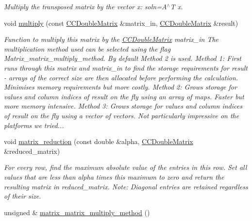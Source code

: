 \begin{DoxyCompactItemize}
\begin{DoxyCompactList}\small\item\em Multiply the transposed matrix by the vector x\+: soln=A$^\wedge$T x. \end{DoxyCompactList}\item 
void \hyperlink{classoomph_1_1CCDoubleMatrix_ae6834fcfc28dca27243ec53ea48d34be}{multiply} (const \hyperlink{classoomph_1_1CCDoubleMatrix}{C\+C\+Double\+Matrix} \&matrix\+\_\+in, \hyperlink{classoomph_1_1CCDoubleMatrix}{C\+C\+Double\+Matrix} \&result)
\begin{DoxyCompactList}\small\item\em Function to multiply this matrix by the \hyperlink{classoomph_1_1CCDoubleMatrix}{C\+C\+Double\+Matrix} matrix\+\_\+in The multiplication method used can be selected using the flag Matrix\+\_\+matrix\+\_\+multiply\+\_\+method. By default Method 2 is used. Method 1\+: First runs through this matrix and matrix\+\_\+in to find the storage requirements for result -\/ arrays of the correct size are then allocated before performing the calculation. Minimises memory requirements but more costly. Method 2\+: Grows storage for values and column indices of result \textquotesingle{}on the fly\textquotesingle{} using an array of maps. Faster but more memory intensive. Method 3\+: Grows storage for values and column indices of result \textquotesingle{}on the fly\textquotesingle{} using a vector of vectors. Not particularly impressive on the platforms we tried... \end{DoxyCompactList}\item 
void \hyperlink{classoomph_1_1CCDoubleMatrix_a600a58c92baf401a534598cedcfd3415}{matrix\+\_\+reduction} (const double \&alpha, \hyperlink{classoomph_1_1CCDoubleMatrix}{C\+C\+Double\+Matrix} \&reduced\+\_\+matrix)
\begin{DoxyCompactList}\small\item\em For every row, find the maximum absolute value of the entries in this row. Set all values that are less than alpha times this maximum to zero and return the resulting matrix in reduced\+\_\+matrix. Note\+: Diagonal entries are retained regardless of their size. \end{DoxyCompactList}\item 
unsigned \& \hyperlink{classoomph_1_1CCDoubleMatrix_ac30e2e7873bf639f36494ab1b03e26d7}{matrix\+\_\+matrix\+\_\+multiply\+\_\+method} ()

\end{DoxyCompactItemize}
